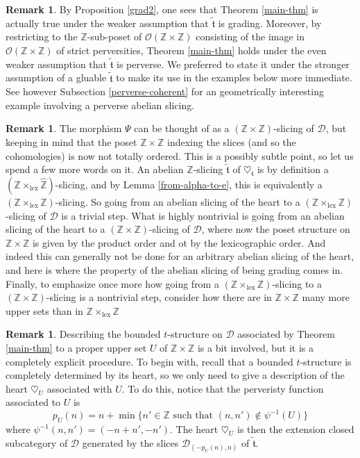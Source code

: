 \documentclass{article}
\theoremstyle{definition}
\newtheorem{rem}[thm]{Remark}
\newcommand{\Z}{\mathbb{Z}}
\newcommand{\Oo}{\mathcal{O}}
\newcommand{\tee}{\mathfrak{t}}
\begin{document}
\begin{rem}By Proposition \ref{grad2}, one sees that
Theorem \ref{main-thm} is actually true under the weaker assumption that $\tilde{\tee}$ is grading. Moreover, by restricting to the $\Z$-sub-poset of $\Oo(\Z\times\Z)$ consisting of the image in $\Oo(\Z\times\Z)$ of strict perversities, Theorem \ref{main-thm} holds under the even weaker assumption that $\tilde{\tee}$ is perverse. We preferred to state it under the stronger assumption of a gluable $\tilde{\tee}$ to make its use in the examples below more immediate. See however Subsection \ref{perverse-coherent} for an geometrically interesting example involving a perverse abelian slicing.
\end{rem}

\begin{rem}
The morphism $\Psi$ can be thought of as a $(\Z\times \Z)$-slicing of $\mathscr{D}$, but keeping in mind that the poset $\Z\times\Z$ indexing the slices (and so the cohomologies) is now not totally ordered. This is a possibly subtle point, so let us spend a few more words on it. An abelian $\mathbb{Z}$-slicing $\tilde{\tee}$ of $\heartsuit_\tee$ is by definition a $(\Z\times_{\mathrm{lex}}\hat{\Z})$-slicing, and by Lemma \ref{from-alpha-to-e}, this is equivalently a $(\Z\times_{\mathrm{lex}}{\Z})$-slicing. So going from an abelian slicing of the heart to a  $(\Z\times_{\mathrm{lex}}{\Z})$-slicing of $\mathscr{D}$ is a trivial step. What is highly nontrivial is going from an abelian slicing of the heart to a $(\Z\times{\Z})$-slicing of $\mathscr{D}$, where now the poset structure on $\Z\times \Z$ is given by the product order and ot by the lexicographic order. And indeed this can generally not be done for an 
arbitrary abelian slicing of the heart, and here is where the property of the abelian slicing of being grading comes in. Finally, to emphasize once more how going from a   $(\Z\times_{\mathrm{lex}}{\Z})$-slicing to a $(\Z\times{\Z})$-slicing is a nontrivial step, consider how there are in $\Z\times{\Z}$ many more upper sets than in $\Z\times_{\mathrm{lex}}{\Z}$
\end{rem}
\begin{rem}
Describing the bounded $t$-structure on $\mathscr{D}$ associated by Theorem \ref{main-thm} to a proper upper set $U$ of $\Z\times \Z$ is a bit involved, but it is a completely explicit procedure. To begin with, recall that a bounded $t$-structure is completely determined by its heart, so we only need to give a description of the heart $\heartsuit_U$ associated with $U$. To do this, notice that the perveristy function associated to $U$ is
\[
p_U(n)=n+\min\{n'\in \Z\text{ such that } (n,n')\notin \psi^{-1}(U)\} 
\]
where $\psi^{-1}(n,n')=(-n+n',-n')$. The heart $\heartsuit_U$ is then the extension closed subcategory of $\mathscr{D}$ generated by the slices $\mathscr{D}_{(-p_U(n),n)}$ of $\tilde{\tee}$.
\end{rem}
\end{document}
